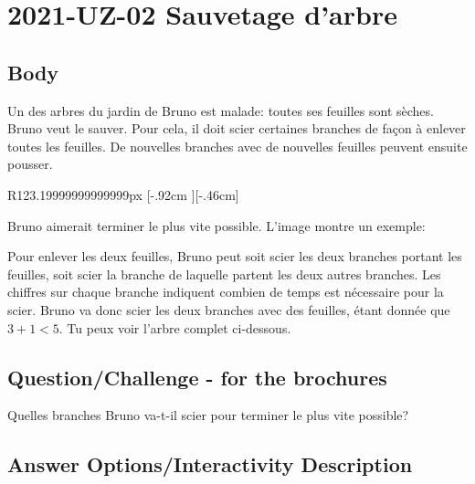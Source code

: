 \documentclass[a4paper,11pt]{report}
\newcommand{\taskGraphicsFolder}{..}
\begin{document}
\section*{\centering{} 2021-UZ-02 Sauvetage d’arbre}


\subsection*{Body}

Un des arbres du jardin de Bruno est malade: toutes ses feuilles sont sèches. Bruno veut le sauver. Pour cela, il doit scier certaines branches de façon à enlever toutes les feuilles. De nouvelles branches avec de nouvelles feuilles peuvent ensuite pousser.

\begin{wrapfigure}{R}{123.19999999999999px}
\raisebox{-.46cm}[\dimexpr \height-.92cm \relax][-.46cm]{}
\end{wrapfigure}

Bruno aimerait terminer le plus vite possible. L’image montre un exemple:

Pour enlever les deux feuilles, Bruno peut soit scier les deux branches portant les feuilles, soit scier la branche de laquelle partent les deux autres branches. Les chiffres sur chaque branche indiquent combien de temps est nécessaire pour la scier. Bruno va donc scier les deux branches avec des feuilles, étant donnée que ${3 + 1 < 5}$. Tu peux voir l’arbre complet ci-dessous.

{\em


\subsection*{Question/Challenge - for the brochures}

Quelles branches Bruno va-t-il scier pour terminer le plus vite possible?

{\centering%
\par}

}

\begingroup
\renewcommand{\arraystretch}{1.5}
\subsection*{Answer Options/Interactivity Description}
\end{document}
